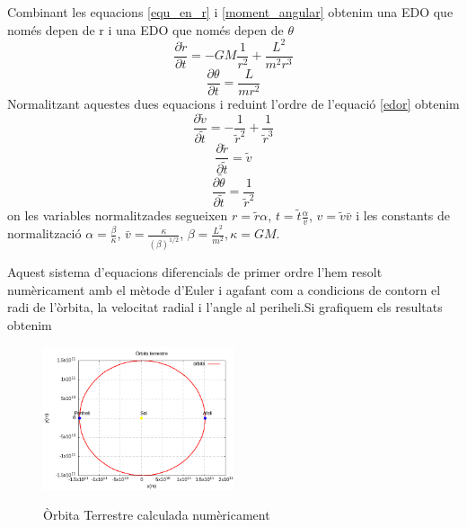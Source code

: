 \documentclass[11pt]{article}
\begin{document}
Combinant les equacions \eqref{equ_en_r} i \eqref{moment_angular} obtenim una EDO que només depen de r i una EDO que només depen de $\theta$
\begin{equation}
    \frac{\partial\dot{r}}{\partial t}=-GM\frac{1}{r^2}+\frac{L^2}{m^2r^3}
    \label{edor}
\end{equation}
\begin{equation}
    \frac{\partial\theta}{\partial t}=\frac{L}{mr^2}
    \label{edot}
\end{equation}
Normalitzant aquestes dues equacions i reduint l'ordre de l'equació \eqref{edor} obtenim
\begin{equation}
    \frac{\partial\tilde{v}}{\partial\tilde{t}}=-\frac{1}{\tilde{r}^2}+\frac{1}{\tilde{r}^3}
    \label{1_edo_r}
\end{equation}
\begin{equation}
    \frac{\partial\tilde{r}}{\partial\tilde{t}}=\tilde{v}
    \label{2_edo_r}
\end{equation}
\begin{equation}
    \frac{\partial\tilde{\theta}}{\partial\tilde{t}}=\frac{1}{\tilde{r}^2}
    \label{edo_tetha}
\end{equation}
on les variables normalitzades segueixen $r=\tilde{r}\alpha$, $t=\tilde{t}\frac{\alpha}{\bar{v}}$, $v=\tilde{v}\bar{v}$ i les constants de normalització $\alpha = \frac{\beta}{\kappa}$, $\bar{v}=\frac{\kappa}{(\beta)^{1/2}}$, $\beta=\frac{L^2}{m^2}, \kappa=GM$.

Aquest sistema d'equacions diferencials de primer ordre l'hem resolt numèricament amb el mètode d'Euler i agafant com a condicions de contorn el radi de l'òrbita, la velocitat radial i l'angle al periheli.\footnotemark[\value{footnote}]
Si grafiquem els resultats obtenim
\begin{figure}[h]
    \centering
    \includegraphics[width=0.5\textwidth]{orbita.png}
    \label{orb_terra}
    \caption{Òrbita Terrestre calculada numèricament}
\end{figure}
\end{document}
